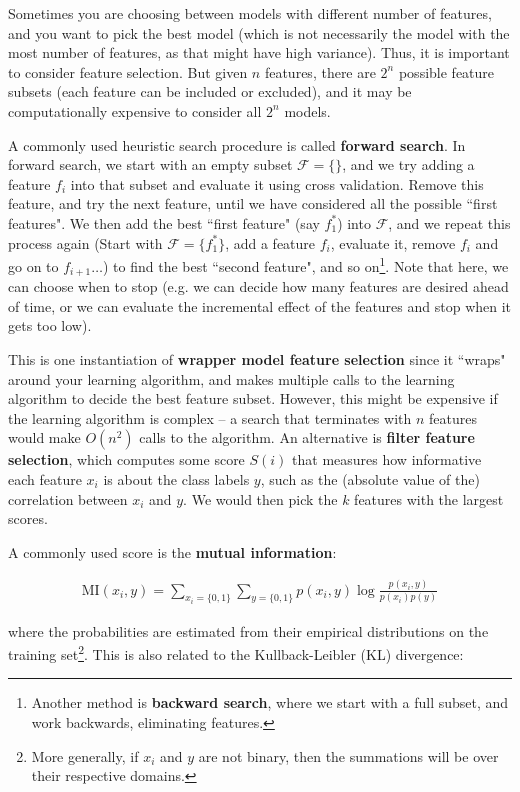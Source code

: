 \documentclass[letterpaper,10pt]{article}
\begin{document}
Sometimes you are choosing between models with different number of features, and you want to pick the best model (which is not necessarily the model with the most number of features, as that might have high variance). Thus, it is important to consider feature selection. But given $n$ features, there are $2^n$ possible feature subsets (each feature can be included or excluded), and it may be computationally expensive to consider all $2^n$ models. 

A commonly used heuristic search procedure is called \textbf{forward search}. In forward search, we start with an empty subset $\mathscr{F} = \{ \}$, and we try adding a feature $f_i$ into that subset and evaluate it using cross validation. Remove this feature, and try the next feature, until we have considered all the possible ``first features". We then add the best ``first feature" (say $f^*_1$) into $\mathscr{F}$, and we repeat this process again (Start with $\mathscr{F} = \{ f^*_1 \}$, add a feature $f_i$, evaluate it, remove $f_i$ and go on to $f_{i+1}\ldots$) to find the best ``second feature", and so on\footnote{Another method is \textbf{backward search}, where we start with a full subset, and work backwards, eliminating features.}. Note that here, we can choose when to stop (e.g. we can decide how many features are desired ahead of time, or we can evaluate the incremental effect of the features and stop when it gets too low).

This is one instantiation of \textbf{wrapper model feature selection} since it ``wraps" around your learning algorithm, and makes multiple calls to the learning algorithm to decide the best feature subset. However, this might be expensive if the learning algorithm is complex -- a search that terminates with $n$ features would make $O(n^2)$ calls to the algorithm. An alternative is \textbf{filter feature selection}, which computes some score $S(i)$ that measures how informative each feature $x_i$ is about the class labels $y$, such as the (absolute value of the) correlation between $x_i$ and $y$. We would then pick the $k$ features with the largest scores.

A commonly used score is the \textbf{mutual information}:

\begin{align}
\text{MI}(x_i,y) = \sum_{x_i = \{0, 1\} } \sum_{y = \{0, 1\} } p(x_i,y) \log \frac{p(x_i,y)}{p(x_i)p(y)}
\end{align}

where the probabilities are estimated from their empirical distributions on the training set\footnote{More generally, if $x_i$ and $y$ are not binary, then the summations will be over their respective domains.}. This is also related to the Kullback-Leibler (KL) divergence:
\end{document}
